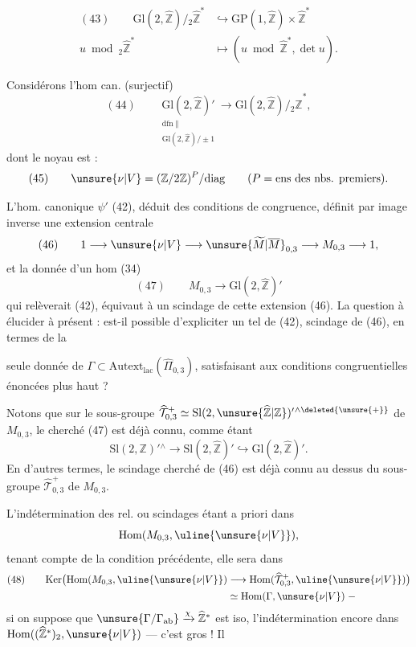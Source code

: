 
\[
\begin{aligned}
(43)\qquad
\mathrm{Gl}(2,\widehat{\mathbb Z})/{}_{2}\widehat{\mathbb Z}^{*}
&\hookrightarrow \mathrm{GP}(1,\widehat{\mathbb Z})\times\widehat{\mathbb Z}^{*}\\
u\bmod {}_{2}\widehat{\mathbb Z}^{*}
&\longmapsto (u\bmod\widehat{\mathbb Z}^{*},\det u).
\end{aligned}
\]

Considérons l'hom can. (surjectif)
\[
(44)\qquad
\underset{\substack{\mathrm{dfn}\;\Vert\\
\mathrm{Gl}(2,\widehat{\mathbb Z})/\pm1}}
{\mathrm{Gl}(2,\widehat{\mathbb Z})'}
\longrightarrow \mathrm{Gl}(2,\widehat{\mathbb Z})/{}_{2}\widehat{\mathbb Z}^{*},
\]
dont le noyau est  :
\[
(45)\qquad
\unsure{\nu|V}=(\mathbb Z/2\mathbb Z)^P/\mathrm{diag}
\qquad (P=\text{ens des nbs. premiers}).
\]

L'hom. canonique $\psi'$ (42), déduit des conditions de congruence,
définit par image inverse une extension centrale
\[
(46)\qquad
1\longrightarrow\unsure{\nu|V}\longrightarrow
\unsure{\widetilde{M}|\overline{M}}_{0,3}\longrightarrow
M_{0,3}\longrightarrow1,
\]
et la donnée d'un hom (34)
\[
(47)\qquad
M_{0,3}\longrightarrow\mathrm{Gl}(2,\widehat{\mathbb Z})'
\]
qui relèverait (42), équivaut à un
scindage de cette extension (46). La question à élucider à présent :
est-il possible d'expliciter un tel  de
(42),  scindage de (46), en termes de la


seule donnée de $\Gamma\subset\mathrm{Autext}_{\mathrm{lac}}
(\widehat{\Pi}_{0,3})$, satisfaisant aux conditions congruentielles
énoncées plus haut ?

Notons que sur le sous-groupe
$\widehat{\mathcal T}_{0,3}^{+}
\simeq \mathrm{Sl}(2,\unsure{\widehat{\mathbb Z}|\mathbb Z})'{}^{\wedge\deleted{\unsure{+}}}$
de $M_{0,3}$, le 
cherché (47) est déjà connu, comme étant
\[
\mathrm{Sl}(2,\mathbb Z)'{}^{\wedge}\longrightarrow
\mathrm{Sl}(2,\widehat{\mathbb Z})'\hookrightarrow
\mathrm{Gl}(2,\widehat{\mathbb Z})'.
\]
En d'autres termes, le scindage cherché de (46) est déjà connu au dessus
du sous-groupe $\widehat{\mathcal T}_{0,3}^{+}$
de $M_{0,3}$.

L'indétermination des rel. ou scindages étant a priori dans
\[
\mathrm{Hom}(M_{0,3},\uline{\unsure{\nu|V}}),
\]
tenant compte de la condition précédente, elle sera dans
\[
\begin{aligned}
(48)\qquad
\mathrm{Ker}\bigl(\mathrm{Hom}(M_{0,3},\uline{\unsure{\nu|V}})
&\longrightarrow
\mathrm{Hom}(\widehat{\mathcal T}_{0,3}^{+},
\uline{\unsure{\nu|V}})\bigr)\\
&\simeq\mathrm{Hom}(\Gamma,\unsure{\nu|V})\;-
\end{aligned}
\]
si on suppose que
$\unsure{\Gamma/\Gamma_{\mathrm{ab}}}\xrightarrow{\chi}\widehat{\mathbb Z}^{*}$
est iso, l'indétermination  encore dans
$\mathrm{Hom}((\widehat{\mathbb Z}^{*})_2,\unsure{\nu|V})$
--- c'est gros ! Il

